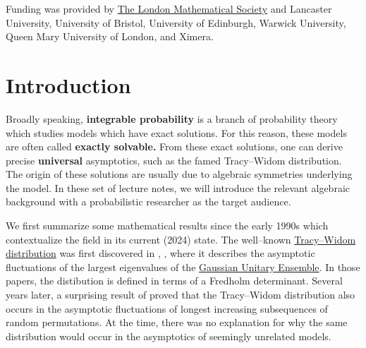 \documentclass{ximera}
\begin{document}
Funding was provided by \href{https://www.lms.ac.uk/grants/visits-uk-scheme-2}{The London Mathematical Society} and 
Lancaster University, University of Bristol, University of Edinburgh, Warwick University, Queen Mary University of London, and Ximera. 


\section{Introduction}

Broadly speaking, \textbf{integrable probability} is a branch of probability theory which studies 
models which have exact solutions. For this reason, these models are often called \textbf{exactly solvable.}
From these exact solutions, one can derive precise \textbf{universal} asymptotics, such as the 
famed Tracy--Widom distribution. The origin of these solutions are usually due to algebraic symmetries 
underlying the model. In these set of lecture notes, we will introduce the relevant algebraic background
with a probabilistic researcher as the target audience. 

We first summarize some mathematical results since the early 1990s which contextualize the field in
its current (2024) state. The well--known 
\href{https://en.wikipedia.org/wiki/Tracy%E2%80%93Widom_distribution}{Tracy--Widom distribution}
was first discovered in \cite{TW93}, \cite{TW94}, where it describes the asymptotic fluctuations
of the largest eigenvalues of the 
\href{https://en.wikipedia.org/wiki/Random_matrix#Gaussian_ensembles}{Gaussian Unitary Ensemble}. 
In those papers, the distibution is defined in terms of a Fredholm determinant.
Several years later, a surprising result of \cite{BDJ99} proved that the Tracy--Widom distribution
also occurs in the asymptotic fluctuations of longest increasing subsequences 
of random permutations. At the time, there was no explanation for why the same distribution would
occur in the asymptotics of seemingly unrelated models. 
\end{document}
